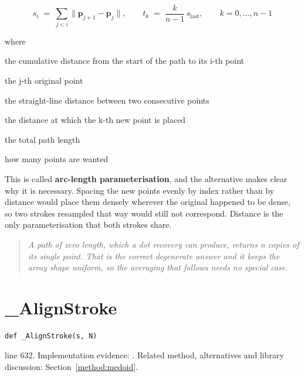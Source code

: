 \begin{equation}
s_i \;=\; \sum_{j<i} \big\| \mathbf{p}_{j+1} - \mathbf{p}_{j} \big\|, \qquad t_k \;=\; \frac{k}{n-1}\, s_{\mathrm{last}}, \qquad k = 0, \dots, n-1
\end{equation}

\noindent where
\begin{description}[leftmargin=2.4em,style=nextline,font=\normalfont\ttfamily]\setlength\itemsep{1pt}
  \item[{$s_i$}] \normalfont the cumulative distance from the start of the path to its i-th point
  \item[{$\mathbf{p}_j$}] \normalfont the j-th original point
  \item[{$\|\cdot\|$}] \normalfont the straight-line distance between two consecutive points
  \item[{$t_k$}] \normalfont the distance at which the k-th new point is placed
  \item[{$s_{\mathrm{last}}$}] \normalfont the total path length
  \item[{$n$}] \normalfont how many points are wanted
\end{description}
This is called \textbf{arc-length parameterisation}, and the alternative makes clear why it is necessary. Spacing the new points evenly by index rather than by distance would place them densely wherever the original happened to be dense, so two strokes resampled that way would still not correspond. Distance is the only parameterisation that both strokes share.


\begin{quote}\small\itshape A path of zero length, which a dot recovery can produce, returns n copies of its single point. That is the correct degenerate answer and it keeps the array shape uniform, so the averaging that follows needs no special case.\end{quote}


\section{\_AlignStroke}\label{fn:style:-AlignStroke}
\begin{lstlisting}[style=sig]
def _AlignStroke(s, N)
\end{lstlisting}
 line 632. Implementation evidence: \cite{code2026}. Related method, alternatives and library discussion: Section~\ref{method:medoid}.


